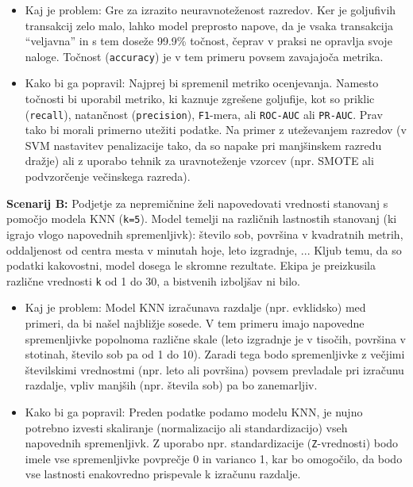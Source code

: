 \documentclass[12pt,a4paper]{article}
\begin{document}
\begin{itemize}
    \item Kaj je problem: Gre za izrazito neuravnoteženost razredov. Ker je goljufivih transakcij zelo malo, lahko model preprosto napove, da je vsaka transakcija ``veljavna'' in s tem doseže 99.9\% točnost, čeprav v praksi ne opravlja svoje naloge. Točnost (\texttt{accuracy}) je v tem primeru povsem zavajajoča metrika.
    \item Kako bi ga popravil: Najprej bi spremenil metriko ocenjevanja. Namesto točnosti bi uporabil metriko, ki kaznuje zgrešene goljufije, kot so priklic (\texttt{recall}), natančnost (\texttt{precision}), \texttt{F1}-mera, ali \texttt{ROC-AUC} ali \texttt{PR-AUC}. Prav tako bi morali primerno utežiti podatke. Na primer z uteževanjem razredov (v SVM nastavitev penalizacije tako, da so napake pri manjšinskem razredu dražje) ali z uporabo tehnik za uravnoteženje vzorcev (npr. SMOTE ali podvzorčenje večinskega razreda).
\end{itemize}

\textbf{Scenarij B:} Podjetje za nepremičnine želi napovedovati vrednosti stanovanj s pomočjo modela KNN (\texttt{k=5}). Model temelji na različnih lastnostih stanovanj (ki igrajo vlogo napovednih spremenljivk): število sob, površina v kvadratnih metrih, oddaljenost od centra mesta v minutah hoje, leto izgradnje, ... Kljub temu, da so podatki kakovostni, model dosega le skromne rezultate. Ekipa je preizkusila različne vrednosti \texttt{k} od 1 do 30, a bistvenih izboljšav ni bilo.

\begin{itemize}
    \item Kaj je problem: Model KNN izračunava razdalje (npr. evklidsko) med primeri, da bi našel najbližje sosede. V tem primeru imajo napovedne spremenljivke popolnoma različne skale (leto izgradnje je v tisočih, površina v stotinah, število sob pa od 1 do 10). Zaradi tega bodo spremenljivke z večjimi številskimi vrednostmi (npr. leto ali površina) povsem prevladale pri izračunu razdalje, vpliv manjših (npr. števila sob) pa bo zanemarljiv.
    \item Kako bi ga popravil: Preden podatke podamo modelu KNN, je nujno potrebno izvesti skaliranje (normalizacijo ali standardizacijo) vseh napovednih spremenljivk. Z uporabo npr. standardizacije (\texttt{Z}-vrednosti) bodo imele vse spremenljivke povprečje 0 in varianco 1, kar bo omogočilo, da bodo vse lastnosti enakovredno prispevale k izračunu razdalje.
\end{itemize}
\end{document}
